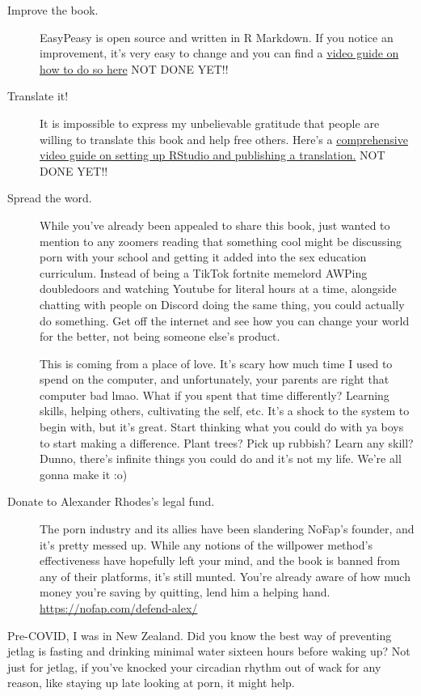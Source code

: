 \documentclass[
]{book}
\begin{document}
\begin{description}
\item[Improve the book.]
EasyPeasy is open source and written in R Markdown. If you notice an improvement, it's very easy to change and you can find a \href{}{video guide on how to do so here} NOT DONE YET!!
\item[Translate it!]
It is impossible to express my unbelievable gratitude that people are willing to translate this book and help free others. Here's a \href{}{comprehensive video guide on setting up RStudio and publishing a translation.} NOT DONE YET!!
\item[Spread the word.]
While you've already been appealed to share this book, just wanted to mention to any zoomers reading that something cool might be discussing porn with your school and getting it added into the sex education curriculum. Instead of being a TikTok fortnite memelord AWPing doubledoors and watching Youtube for literal hours at a time, alongside chatting with people on Discord doing the same thing, you could actually do something. Get off the internet and see how you can change your world for the better, not being someone else's product.

This is coming from a place of love. It's scary how much time I used to spend on the computer, and unfortunately, your parents are right that computer bad lmao. What if you spent that time differently? Learning skills, helping others, cultivating the self, etc. It's a shock to the system to begin with, but it's great. Start thinking what you could do with ya boys to start making a difference. Plant trees? Pick up rubbish? Learn any skill? Dunno, there's infinite things you could do and it's not my life. We're all gonna make it :o)
\item[Donate to Alexander Rhodes's legal fund.]
The porn industry and its allies have been slandering NoFap's founder, and it's pretty messed up. While any notions of the willpower method's effectiveness have hopefully left your mind, and the book is banned from any of their platforms, it's still munted. You're already aware of how much money you're saving by quitting, lend him a helping hand. \url{https://nofap.com/defend-alex/}
\end{description}

Pre-COVID, I was in New Zealand. Did you know the best way of preventing jetlag is fasting and drinking minimal water sixteen hours before waking up? Not just for jetlag, if you've knocked your circadian rhythm out of wack for any reason, like staying up late looking at porn, it might help.
\end{document}
